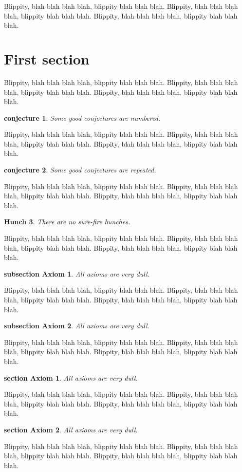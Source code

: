 \documentclass{article}
\newtheorem{guess}{conjecture}
\newtheorem{axiom}{subsection Axiom}[subsection]
\newtheorem{axioms}{section Axiom}[section]
\newtheorem{hunch}[guess]{Hunch}
\begin{document}
Blippity, blah blah blah blah, blippity blah blah blah.
Blippity, blah blah blah blah, blippity blah blah blah.
Blippity, blah blah blah blah, blippity blah blah blah.
\section{First section}
Blippity, blah blah blah blah, blippity blah blah blah.
Blippity, blah blah blah blah, blippity blah blah blah.
Blippity, blah blah blah blah, blippity blah blah blah.
\begin{guess}Some good conjectures are numbered.\end{guess}
Blippity, blah blah blah blah, blippity blah blah blah.
Blippity, blah blah blah blah, blippity blah blah blah.
Blippity, blah blah blah blah, blippity blah blah blah.
\begin{guess}Some good conjectures are repeated.\end{guess}
Blippity, blah blah blah blah, blippity blah blah blah.
Blippity, blah blah blah blah, blippity blah blah blah.
Blippity, blah blah blah blah, blippity blah blah blah.
\begin{hunch} There are no sure-fire hunches. \end{hunch}
Blippity, blah blah blah blah, blippity blah blah blah.
Blippity, blah blah blah blah, blippity blah blah blah.
Blippity, blah blah blah blah, blippity blah blah blah.
\begin{axiom} All axioms are very dull. \end{axiom}
Blippity, blah blah blah blah, blippity blah blah blah.
Blippity, blah blah blah blah, blippity blah blah blah.
Blippity, blah blah blah blah, blippity blah blah blah.
\begin{axiom} All axioms are very dull. \end{axiom}
Blippity, blah blah blah blah, blippity blah blah blah.
Blippity, blah blah blah blah, blippity blah blah blah.
Blippity, blah blah blah blah, blippity blah blah blah.
\begin{axioms} All axioms are very dull. \end{axioms}
Blippity, blah blah blah blah, blippity blah blah blah.
Blippity, blah blah blah blah, blippity blah blah blah.
Blippity, blah blah blah blah, blippity blah blah blah.
\begin{axioms} All axioms are very dull. \end{axioms}
Blippity, blah blah blah blah, blippity blah blah blah.
Blippity, blah blah blah blah, blippity blah blah blah.
Blippity, blah blah blah blah, blippity blah blah blah.
\end{document}
